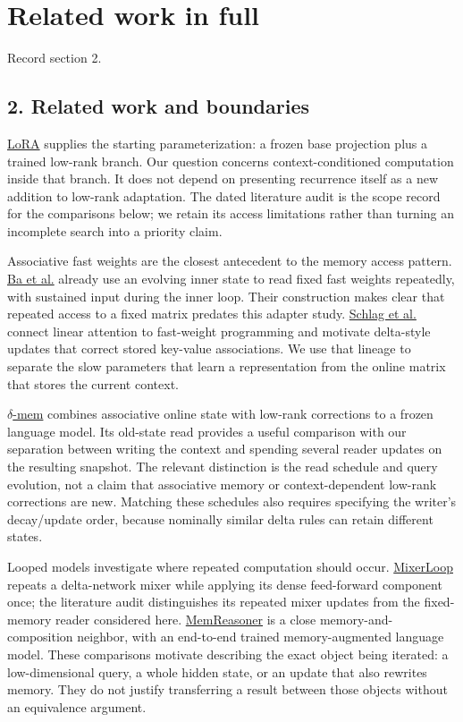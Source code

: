 \section{Related work in full}\label{app:H}
\noindent Record section 2.
\subsection*{2. Related work and boundaries}

\href{https://arxiv.org/abs/2106.09685}{LoRA} supplies the starting parameterization: a frozen
base projection plus a trained low-rank branch. Our question concerns context-conditioned
computation inside that branch. It does not depend on presenting recurrence itself as a
new addition to low-rank adaptation. The dated literature audit
is the scope record for the comparisons below; we retain its access limitations rather
than turning an incomplete search into a priority claim.

Associative fast weights are the closest antecedent to the memory access pattern.
\href{https://arxiv.org/html/1610.06258v3}{Ba et al.} already use an evolving inner state to
read fixed fast weights repeatedly, with sustained input during the inner loop. Their
construction makes clear that repeated access to a fixed matrix predates this adapter
study. \href{https://proceedings.mlr.press/v139/schlag21a.html}{Schlag et al.} connect linear
attention to fast-weight programming and motivate delta-style updates that correct
stored key-value associations. We use that lineage to separate the slow parameters
that learn a representation from the online matrix that stores the current context.

\href{https://arxiv.org/html/2605.12357v2}{\ensuremath{\delta}-mem} combines associative online state with
low-rank corrections to a frozen language model. Its old-state read provides a useful
comparison with our separation between writing the context and spending several reader
updates on the resulting snapshot. The relevant distinction is the read schedule and
query evolution, not a claim that associative memory or context-dependent low-rank
corrections are new. Matching these schedules also requires specifying the writer’s
decay/\allowbreak{}update order, because nominally similar delta rules can retain different states.

Looped models investigate where repeated computation should occur.
\href{https://arxiv.org/abs/2608.18230}{MixerLoop} repeats a delta-network mixer while applying
its dense feed-forward component once; the literature audit distinguishes its repeated
mixer updates from the fixed-memory reader considered here. \href{https://arxiv.org/abs/2503.07903}{MemReasoner}
is a close memory-and-composition neighbor, with an end-to-end trained memory-augmented
language model. These comparisons motivate describing the exact object being iterated:
a low-dimensional query, a whole hidden state, or an update that also rewrites memory.
They do not justify transferring a result between those objects without an equivalence
argument.

